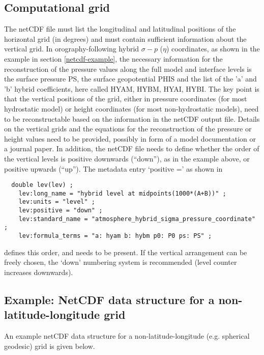 \documentclass[times,doublespace]{fldauth}
\begin{document}
{\begin{appendix}
\subsection{Computational grid}
The netCDF file must list the longitudinal and latitudinal positions of the horizontal grid (in degrees) and must contain sufficient information about the vertical grid. In orography-following hybrid $\sigma-p$ ($\eta$) coordinates, as shown in the example in section \ref{netcdf-example}, the necessary information for the reconstruction of the pressure values along the full model and interface levels is the surface pressure PS, the surface geopotential PHIS and the list of the 'a' and 'b' hybrid coefficients, here called HYAM, HYBM, HYAI, HYBI. 
The key point is that the vertical positions of the grid, either in pressure coordinates (for most hydrostatic model) or height coordinates (for most non-hydrostatic models), need to be reconstructable based on the information in the netCDF output file. Details on the vertical grids and the equations for the reconstruction of the pressure or height values need to be provided, possibly in form of a model documentation or a journal paper. In addition, the netCDF file needs to define whether the order of the vertical levels is positive downwards (``down''), as in the example above, or positive upwards (``up''). The metadata entry `positive =' as shown in
\begin{verbatim}
  double lev(lev) ;
    lev:long_name = "hybrid level at midpoints(1000*(A+B))" ;
    lev:units = "level" ;
    lev:positive = "down" ;
    lev:standard_name = "atmosphere_hybrid_sigma_pressure_coordinate" ;
    lev:formula_terms = "a: hyam b: hybm p0: P0 ps: PS" ;
\end{verbatim}
defines this order, and needs to be present. If the vertical arrangement can be freely chosen, the `down' numbering system is recommended (level counter increases downwards).

\subsection{Example: NetCDF data structure for a non-latitude-longitude grid}
An example netCDF data structure for a non-latitude-longitude (e.g. spherical geodesic) grid is given below.


\end{appendix}}
\end{document}
